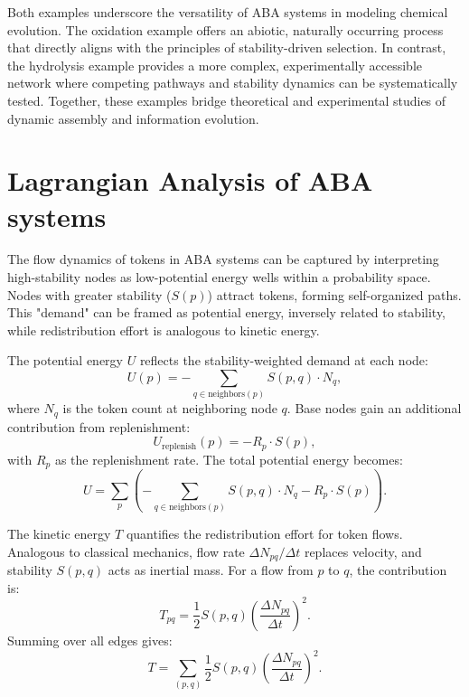 \documentclass[entropy,article,submit,pdftex,oneauthor]{Definitions/mdpi}
\begin{document}
Both examples underscore the versatility of ABA systems in modeling chemical evolution. The oxidation example offers an abiotic, naturally occurring process that directly aligns with the principles of stability-driven selection. In contrast, the hydrolysis example provides a more complex, experimentally accessible network where competing pathways and stability dynamics can be systematically tested. Together, these examples bridge theoretical and experimental studies of dynamic assembly and information evolution.


\section{Lagrangian Analysis of ABA systems}

The flow dynamics of tokens in ABA systems can be captured by interpreting high-stability nodes as low-potential energy wells within a probability space. Nodes with greater stability (\( S(p) \)) attract tokens, forming self-organized paths. This "demand" can be framed as potential energy, inversely related to stability, while redistribution effort is analogous to kinetic energy.

The potential energy \( U \) reflects the stability-weighted demand at each node:
\begin{equation}
U(p) = -\sum_{q \in \text{neighbors}(p)} S(p, q) \cdot N_q,
\end{equation}
where \( N_q \) is the token count at neighboring node \( q \). Base nodes gain an additional contribution from replenishment:
\begin{equation}
U_{\text{replenish}}(p) = -R_p \cdot S(p),
\end{equation}
with \( R_p \) as the replenishment rate. The total potential energy becomes:
\begin{equation}
U = \sum_{p} \left( -\sum_{q \in \text{neighbors}(p)} S(p, q) \cdot N_q - R_p \cdot S(p) \right).
\end{equation}

The kinetic energy \( T \) quantifies the redistribution effort for token flows. Analogous to classical mechanics, flow rate \( \Delta N_{pq} / \Delta t \) replaces velocity, and stability \( S(p, q) \) acts as inertial mass. For a flow from \( p \) to \( q \), the contribution is:
\begin{equation}
T_{pq} = \frac{1}{2} S(p, q) \left( \frac{\Delta N_{pq}}{\Delta t} \right)^2.
\end{equation}
Summing over all edges gives:
\begin{equation}
T = \sum_{(p, q)} \frac{1}{2} S(p, q) \left( \frac{\Delta N_{pq}}{\Delta t} \right)^2.
\end{equation}
\end{document}
